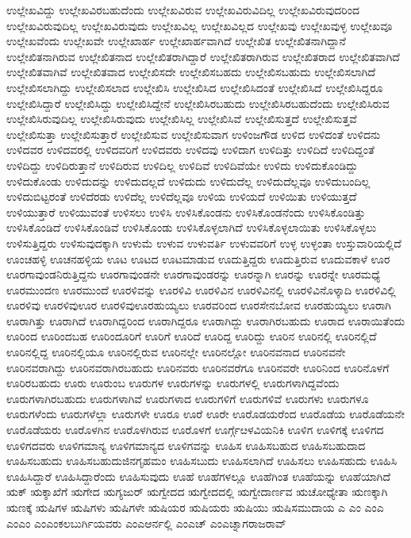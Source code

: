 {ಉಲ್ಲೇಖವಿದ್ದು
ಉಲ್ಲೇಖವಿರಬಹುದೆಂದು
ಉಲ್ಲೇಖವಿರುವ
ಉಲ್ಲೇಖವಿರುವಿದಿಲ್ಲ
ಉಲ್ಲೇಖವಿರುವುದರಿಂದ
ಉಲ್ಲೇಖವಿರುವುದಿಲ್ಲ
ಉಲ್ಲೇಖವಿರುವುದು
ಉಲ್ಲೇಖವಿಲ್ಲ
ಉಲ್ಲೇಖವಿಲ್ಲದ
ಉಲ್ಲೇಖವು
ಉಲ್ಲೇಖವುಳ್ಳ
ಉಲ್ಲೇಖವೂ
ಉಲ್ಲೇಖವೆಂದು
ಉಲ್ಲೇಖವೇ
ಉಲ್ಲೇಖಾರ್ಹ
ಉಲ್ಲೇಖಾರ್ಹವಾಗಿದೆ
ಉಲ್ಲೇಖಿತ
ಉಲ್ಲೇಖಿತನಾಗಿದ್ದಾನೆ
ಉಲ್ಲೇಖಿತನಾಗಿರುವ
ಉಲ್ಲೇಖಿತನಾದ
ಉಲ್ಲೇಖಿತರಾಗಿದ್ದಾರೆ
ಉಲ್ಲೇಖಿತರಾಗಿರುವ
ಉಲ್ಲೇಖಿತರಾದ
ಉಲ್ಲೇಖಿತವಾಗಿದೆ
ಉಲ್ಲೇಖಿತವಾಗಿವೆ
ಉಲ್ಲೇಖಿತವಾದ
ಉಲ್ಲೇಖಿಸದೇ
ಉಲ್ಲೇಖಿಸಬಹದು
ಉಲ್ಲೇಖಿಸಬಹುದು
ಉಲ್ಲೇಖಿಸಲಾಗಿದೆ
ಉಲ್ಲೇಖಿಸಲಾಗಿದ್ದು
ಉಲ್ಲೇಖಿಸಲಾದ
ಉಲ್ಲೇಖಿಸಿ
ಉಲ್ಲೇಖಿಸಿದ
ಉಲ್ಲೇಖಿಸಿದಂತೆ
ಉಲ್ಲೇಖಿಸಿದೆ
ಉಲ್ಲೇಖಿಸಿದ್ದರೂ
ಉಲ್ಲೇಖಿಸಿದ್ದಾರೆ
ಉಲ್ಲೇಖಿಸಿದ್ದು
ಉಲ್ಲೇಖಿಸಿದ್ದೇನೆ
ಉಲ್ಲೇಖಿಸಿರಬಹುದು
ಉಲ್ಲೇಖಿಸಿರಬಹುದೆಂದು
ಉಲ್ಲೇಖಿಸಿರುವ
ಉಲ್ಲೇಖಿಸಿರುವುದಿಲ್ಲ
ಉಲ್ಲೇಖಿಸಿರುವುದು
ಉಲ್ಲೇಖಿಸಿಲ್ಲ
ಉಲ್ಲೇಖಿಸಿವೆ
ಉಲ್ಲೇಖಿಸುತ್ತದೆ
ಉಲ್ಲೇಖಿಸುತ್ತವೆ
ಉಲ್ಲೇಖಿಸುತ್ತಾ
ಉಲ್ಲೇಖಿಸುತ್ತಾರೆ
ಉಲ್ಲೇಖಿಸುವ
ಉಲ್ಲೇಖಿಸುವಾಗ
ಉಳಿಂಜಗೌಡ
ಉಳಿದ
ಉಳಿದಂತೆ
ಉಳಿದನು
ಉಳಿದವರ
ಉಳಿದವರಲ್ಲಿ
ಉಳಿದವರಿಗೆ
ಉಳಿದವರು
ಉಳಿದವು
ಉಳಿದಾಗ
ಉಳಿದಿತ್ತು
ಉಳಿದಿದೆ
ಉಳಿದಿದ್ದಂತೆ
ಉಳಿದಿದ್ದು
ಉಳಿದಿರುತ್ತಾನೆ
ಉಳಿದಿರುವ
ಉಳಿದಿಲ್ಲ
ಉಳಿದಿವೆ
ಉಳಿದಿವೆಯೇ
ಉಳಿದು
ಉಳಿದುಕೊಂಡಿದ್ದು
ಉಳಿದುಕೊಂಡು
ಉಳಿದುದನ್ನು
ಉಳಿದುದಲ್ಲದೆ
ಉಳಿದುದು
ಉಳಿದುದೆಲ್ಲ
ಉಳಿದುದೆಲ್ಲವೂ
ಉಳಿದುಬಂದಿಲ್ಲ
ಉಳಿದುಬಿಟ್ಟರಂತೆ
ಉಳಿದೆರಡು
ಉಳಿದೆಲ್ಲ
ಉಳಿದೆಲ್ಲವೂ
ಉಳಿಯ
ಉಳಿಯದೆ
ಉಳಿಯಿತು
ಉಳಿಯುತ್ತದೆ
ಉಳಿಯುತ್ತಾರೆ
ಉಳಿಯುವಂತೆ
ಉಳಿಸಲು
ಉಳಿಸಿ
ಉಳಿಸಿಕೊಂಡನು
ಉಳಿಸಿಕೊಂಡನೆಂದು
ಉಳಿಸಿಕೊಂಡಿತ್ತು
ಉಳಿಸಿಕೊಂಡಿದೆ
ಉಳಿಸಿಕೊಂಡಿವೆ
ಉಳಿಸಿಕೊಂಡು
ಉಳಿಸಿಕೊಳ್ಳಲಾಗಿದೆ
ಉಳಿಸಿಕೊಳ್ಳಲಾಯಿತು
ಉಳಿಸಿಕೊಳ್ಳಲು
ಉಳಿಸುತ್ತಿದ್ದರು
ಉಳಿಸುವುದಕ್ಕಾಗಿ
ಉಳುಮೆ
ಉಳುವ
ಉಳುವರ್ತಿ
ಉಳುವವರಿಗೆ
ಉಳ್ಳ
ಉಳ್ಳಂತಾ
ಉಸ್ತುವಾರಿಯಲ್ಲಿದೆ
ಊಂಚಹಳ್ಳಿ
ಊಚನಹಳ್ಳಿಯ
ಊಟ
ಊಟದ
ಊಟಮಾಡುವ
ಊದುತ್ತಿದ್ದರು
ಊದುತ್ತಿರುವ
ಊದುವಕಾಳೆ
ಊರ
ಊರಗಾವುಂಡನಿರುತ್ತಿದ್ದನು
ಊರಗಾವುಂಡನೇ
ಊರಗಾವುಂಡರನ್ನು
ಊರನ್ನಾಗಿ
ಊರನ್ನು
ಊರನ್ನೇ
ಊರಮಧ್ಯೆ
ಊರಮುಂದಣ
ಊರಮುಂದೆ
ಊರಳಿವನ್ನು
ಊರಳಿವಿ
ಊರಳಿವಿನ
ಊರಳಿವಿನಲ್ಲಿ
ಊರಳಿವಿನೊಳ್ಕಾದಿ
ಊರಳಿವಿಲ್ಲಿ
ಊರಳಿವು
ಊರಳಿವುಊರ
ಊರಳಿವುಊರಹುಯ್ಯಲು
ಊರವರಿಂದ
ಊರಸೇನಬೋವ
ಊರಹುಯ್ಯಲು
ಊರಾಗಿ
ಊರಾಗಿತ್ತು
ಊರಾಗಿದೆ
ಊರಾಗಿದ್ದರಿಂದ
ಊರಾಗಿದ್ದರೂ
ಊರಾಗಿದ್ದು
ಊರಾಗಿರಬಹುದು
ಊರಾದ
ಊರಾಯಿತೆಂದು
ಊರಿಂದ
ಊರಿಂದಬಹ
ಊರಿಂದೂರಿಗೆ
ಊರಿಗೆ
ಊರಿದೆ
ಊರಿದ್ದ
ಊರಿದ್ದು
ಊರಿನ
ಊರಿನಲ್ಲಿ
ಊರಿನಲ್ಲಿದೆ
ಊರಿನಲ್ಲಿದ್ದ
ಊರಿನಲ್ಲಿಯೂ
ಊರಿನಲ್ಲಿರುವ
ಊರಿನಲ್ಲೇ
ಊರಿನಲ್ಲೋ
ಊರಿನವನಾದ
ಊರಿನವನೇ
ಊರಿನವರಾಗಿದ್ದು
ಊರಿನವರಾಗಿರಬಹುದು
ಊರಿನವರು
ಊರಿನವರೆಗೂ
ಊರಿನವರೇ
ಊರಿನಿಂದ
ಊರಿನೊಳಗೆ
ಊರಿರಬಹುದು
ಊರು
ಊರುಂಬ
ಊರುಗಳ
ಊರುಗಳನ್ನು
ಊರುಗಳಲ್ಲಿ
ಊರುಗಳಾಗಿದ್ದವೆಂದು
ಊರುಗಳಾಗಿರಬಹುದು
ಊರುಗಳಾಗಿವೆ
ಊರುಗಳಾದ
ಊರುಗಳಿಗೆ
ಊರುಗಳಿವೆ
ಊರುಗಳು
ಊರುಗಳೂ
ಊರುಗಳೆಂದು
ಊರುಗಳೆಲ್ಲಾ
ಊರುಗಳೇ
ಊರೂ
ಊರೆ
ಊರೇ
ಊರೊಡಯರೆಂದ
ಊರೊಡೆಯ
ಊರೊಡೆಯನೇ
ಊರೊಡೆಯರು
ಊರೊಳಗಿನ
ಊರೊಳಗಿರುವ
ಊರೊಳಗೆ
ಊರ್ಗ್ಗೆೞಳವಿಯನಿಕಿ
ಊಳಿಗ
ಊಳಿಗಕ್ಕೆ
ಊಳಿಗದ
ಊಳಿಗದವರು
ಊಳಿಗಮಾನ್ಯ
ಊಳಿಗಮಾನ್ಯದ
ಊಳಿಗವನ್ನು
ಊಹಿಸ
ಊಹಿಸಬಹುದ
ಊಹಿಸಬಹುದಾದ
ಊಹಿಸಬಹುದು
ಊಹಿಸಬಹುದುಜಿನಗೃಹಮಂ
ಊಹಿಸಬುದು
ಊಹಿಸಲಾಗಿದೆ
ಊಹಿಸಲು
ಊಹಿಸಹುದು
ಊಹಿಸಿ
ಊಹಿಸಿದ್ದಾರೆ
ಊಹಿಸಿದ್ದಾರೆಂದು
ಊಹಿಸುವುದು
ಊಹೆ
ಊಹೆಗಳಲ್ಲೂ
ಊಹೆಗಿಂತ
ಊಹೆಯನ್ನು
ಊಹೆಯಾಗಿದೆ
ಋಕ್
ಋಕ್ಶಾಖೆಗೆ
ಋಗೇದ
ಋಗ್ಯಜುರ್
ಋಗ್ವೇದದ
ಋಗ್ವೇದದಲ್ಲಿ
ಋಗ್ವೇದಾರ್ಣವ
ಋಚೋಧ್ಯೇತಾ
ಋಣಕ್ಕಾಗಿ
ಋಣಕ್ಕೆ
ಋಷಿಗಳ
ಋಷಿಗಳು
ಋಷಿಗಳೇ
ಋಷಿಯರ
ಋಷಿಯರು
ಋಷಿಯು
ಋಷಿಸಮುದಾಯ
ಎ
ಎಂ
ಎಂಎ
ಎಂಎಂ
ಎಂಎಂಕಲಬುರ್ಗಿಯವರು
ಎಂಎಆರ್ನಲ್ಲಿ
ಎಂಎಚ್
ಎಂಎಚ್ನಾಗರಾಜರಾವ್
}
